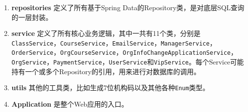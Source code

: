 \documentclass[11pt]{article}
\begin{document}
\begin{enumerate}
    \item \textbf{repositories} 定义了所有基于Spring Data的Repository类，是对底层SQL查询的一层封装。
    \item \textbf{service} 定义了所有核心业务逻辑，其中一共有11个类，分别是\texttt{ClassService}，\texttt{CourseService}，\texttt{EmailService}，\texttt{ManagerService}，\texttt{OrderService}，\texttt{OrgCourseService}，\texttt{OrgInfoChangeApplicationService}，\texttt{OrgService}，\texttt{PaymentService}，\texttt{UserService}和\texttt{VipService}。每个Service可能持有一个或多个Repository的引用，用来进行对数据库的调用。
    \item \textbf{utils} 其他的工具类，比如生成7位机构码以及其他各种\texttt{Enum}类型。
    \item \textbf{Application} 是整个Web应用的入口。
\end{enumerate}
\end{document}
